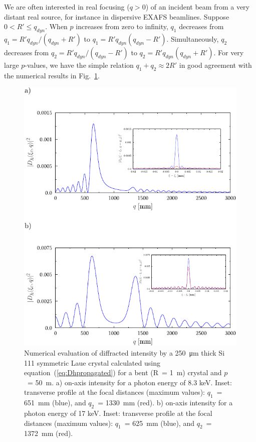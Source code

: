 \documentclass[preprint]{iucr}              %
\newcommand{\inred}[1]{{\color{red}#1}}
\begin{document}
We are often interested in real focusing ($q>0$) of an incident beam from a very distant real source, for instance in dispersive EXAFS beamlines. 
Suppose $0<R'\le q_{dyn}$. When $p$ increases from zero to infinity, $q_1$ decreases from $q_1=R'q_{dyn}/(q_{dyn}+R')$ to 
$q_1=R' q_{dyn}(q_{dyn}-R')$.
Simultaneously, $q_2$ decreases from $q_2=R'q_{dyn}/(q_{dyn}-R')$ to 
$q_2=R'q_{dyn}(q_{dyn}+R')$.
For very large $p$-values, we have the simple relation $q_1+q_2\approx 2R'$ \inred{in good agreement with the numerical results in Fig.~\ref{fig:8keV}.}

\begin{figure}
\label{fig:8keV}
\caption{Numerical evaluation of diffracted intensity by a \SI{250}{\micro\meter} thick Si 111 symmetric Laue crystal calculated using equation~(\ref{eq:Dhpropagated}) for a bent (R~= \SI{1}{\meter}) crystal and $p$~= \SI{50}{\meter}. 
a) on-axis intensity for a photon energy of 8.3 keV. 
Inset: transverse profile at the focal distances (maximum values):  
$q_1$~= \SI{651}{\milli\meter} (blue), and
$q_2$~= \SI{1330}{\milli\meter} (red).
b) on-axis intensity for a photon energy of 17 keV.
Inset: transverse profile at the focal distances (maximum values):
$q_1$~= \SI{625}{\milli\meter} (blue), and 
$q_2$~= \SI{1372}{\milli\meter} (red).
}
\includegraphics[width=1\textwidth]{fig5.pdf}


\end{figure}
\end{document}
